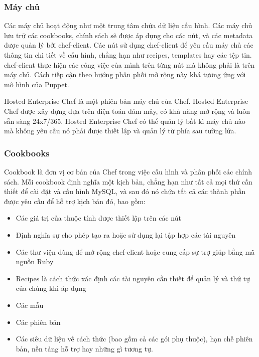 \newpage
\clearpage

\subsubsection{Máy chủ}


Các máy chủ hoạt động như một trung tâm chứa dữ liệu cấu hình. Các máy chủ lưu trữ các cookbooks, chính sách sẽ được áp dụng cho các nút, và các metadata được quản lý bởi chef-client. Các nút sử dụng chef-client để yêu cầu máy chủ các thông tin chi tiết về cấu hình, chẳng hạn như recipes, templates hay các tệp tin. chef-client thực hiện các công việc của mình trên từng nút mà không phải là trên máy chủ. Cách tiếp cận theo hướng phân phối mở rộng này khá tương ứng với mô hình của Puppet.

Hosted Enterprise Chef là một phiên bản máy chủ của Chef. Hosted Enterprise Chef được xây dựng dựa trên điện toán đám mây, có khả năng mở rộng và luôn sẵn sàng 24x7/365. Hosted Enterprise Chef có thể quản lý bất kì máy chủ nào mà không yêu cầu nó phải được thiết lập và quản lý từ phía sau tường lửa.

\subsubsection{Cookbooks}


Cookbook là đơn vị cơ bản của Chef trong việc cấu hình và phân phối các chính sách. Mỗi cookbook định nghĩa một kịch bản, chẳng hạn như tất cả mọi thứ cần thiết để cài đặt và cấu hình MySQL, và sau đó nó chứa tất cả các thành phần được yêu cầu để hỗ trợ kịch bản đó, bao gồm:

\begin{itemize}
\item Các giá trị của thuộc tính được thiết lập trên các nút
\item Định nghĩa sự cho phép tạo ra hoặc sử dụng lại tập hợp các tài nguyên
\item Các thư viện dùng để mở rộng chef-client hoặc cung cấp sự trợ giúp bằng mã nguồn Ruby
\item Recipes là cách thức xác định các tài nguyên cần thiết để quản lý và thứ tự của chúng khi áp dụng
\item Các mẫu
\item Các phiên bản
\item Các siêu dữ liệu về cách thức (bao gồm cả các gói phụ thuộc), hạn chế phiên bản, nền tảng hỗ trợ hay những gì tương tự.
\end{itemize}

